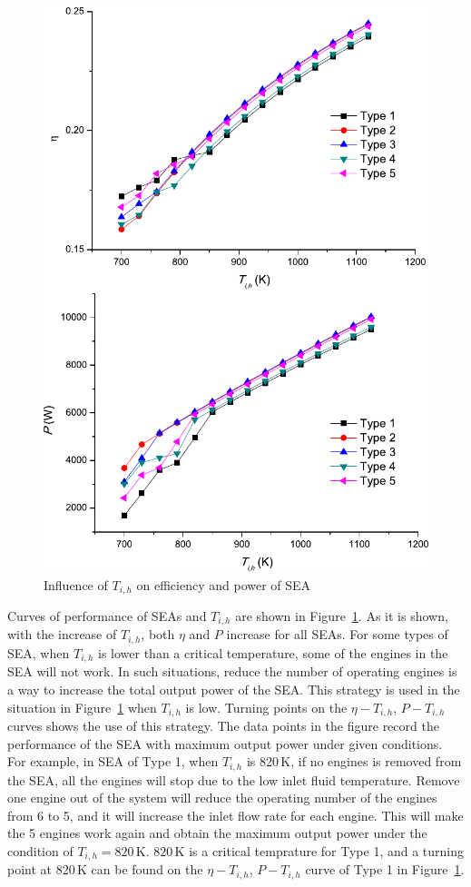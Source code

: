 \noindent \begin{figure}[htbp]
\begin{center}
	\includegraphics[width = 0.7\columnwidth]{fig/T_ih}
	\caption{Influence of $T_{i,h}$ on efficiency and power of SEA}
	\label{fig:Ti_h}
\end{center}
\end{figure}

Curves of performance of SEAs and $T_{i,h}$ are shown in Figure~\ref{fig:Ti_h}.
As it is shown, with the increase of $T_{i,h}$, both $\eta$ and $P$ increase for all SEAs. For some types of SEA, when $T_{i,h}$ is lower than a critical temperature, some of the engines in the SEA will not work. In such situations, reduce the number of operating engines is a way to increase the total output power of the SEA. This strategy is used in the situation in Figure~\ref{fig:Ti_h} when $T_{i,h}$ is low. Turning points on the $\eta-T_{i,h}$, $P-T_{i,h}$ curves shows the use of this strategy. The data points in the figure record the performance of the SEA with maximum output power under given conditions. 
For example, in SEA of Type 1, when $T_{i,h}$ is  820\,K, if no engines is removed from the SEA, all the engines will stop due to the low inlet fluid temperature. Remove one engine out of the system will reduce the operating number of the engines from 6 to 5, and it will increase the inlet flow rate for each engine. This will make the 5 engines work again and obtain the maximum output power under the condition of $T_{i,h} = 820\,\mathrm{K}$. $820\,\mathrm{K}$ is a critical temprature for Type 1, and a turning point at 820\,K can be found on the $\eta-T_{i,h}$, $P-T_{i,h}$ curve of Type 1 in Figure~\ref{fig:Ti_h}. 

